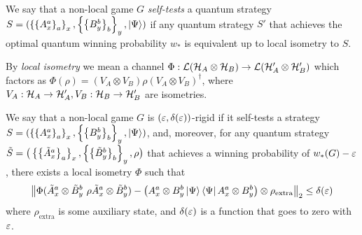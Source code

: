 	

	


\begin{definition}
We say that a non-local game $G$ \emph{self-tests} a quantum strategy $S = (\left\{\left\{A_x^a\right\}_a\right\}_x, \left\{\left\{B_y^b\right\}_b\right\}_y, \ket{\Psi}) $ if any quantum strategy $S'$ that achieves the optimal quantum winning probability $w_*$ is equivalent up to local isometry to $S$.
\end{definition}
By \emph{local isometry} we mean a channel $\Phi: \mathcal L(\mathcal H_A\otimes \mathcal H_B) \to \mathcal L(\mathcal H_A'\otimes \mathcal H_B')$ which factors as $\Phi(\rho) = (V_A\otimes V_B) \rho(V_A\otimes V_B)^\dagger$, where $V_A: \mathcal H_A\to \mathcal H_A', V_B: \mathcal H_B\to \mathcal H_B'$ are isometries.

\begin{definition} We say that a non-local game $G$ is $\left(\varepsilon,\delta(\varepsilon)\right)$-rigid if it self-tests a strategy $S = (\left\{\left\{A_x^a\right\}_a\right\}_x, \left\{\left\{B_y^b\right\}_b\right\}_y, \ket{\Psi})$, and, moreover, for any quantum strategy $\tilde{S} = \big(\left\{\left\{\tilde{A}_x^{a}\right\}_a\right\}_x, \left\{\left\{\tilde{B}_y^{b}\right\}_b\right\}_y, \rho \big)$ that achieves a winning probability of $w_*(G) - \varepsilon$, there exists a local isometry $\Phi$ such that 
\begin{equation}
\left\Vert\Phi(\tilde{A}_x^{a}\otimes \tilde{B}_y^{b}\ \rho \tilde{A}_x^{a}\otimes \tilde{B}_y^{b}) - \big(A_x^a\otimes B_y^b \ket{\Psi}\bra{\Psi} A_x^a\otimes B_y^b \big)\otimes \rho_{\text{extra}}\right\Vert_{2} \leq \delta(\varepsilon)
\end{equation}
where $\rho_{\text{extra}}$ is some auxiliary state, and $\delta(\varepsilon)$ is a function that goes to zero with $\varepsilon$.
\end{definition}
